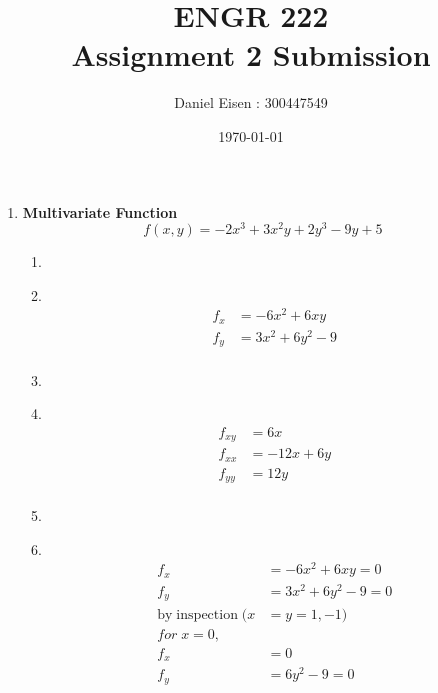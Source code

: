 \documentclass[11pt]{article}
\title{ENGR 222 \\ Assignment 2 Submission}
\author{Daniel Eisen : 300447549}
\date{\today}
\newcommand\Item[1][]{%
  \ifx\relax#1\relax  \item \else \item[#1] \fi
  \abovedisplayskip=0pt\abovedisplayshortskip=0pt~\vspace*{-\baselineskip}}
\begin{document}
\begin{preview}

    \maketitle

    \begin{enumerate}
        \item \textbf{Multivariate Function}
              $$f(x,y) = -2x^{3} + 3x^{2}y + 2y^{3} - 9y + 5$$
              \begin{enumerate}
                  \Item
                  \begin{align*}
                      f_{x} & = -6x^{2} + 6xy       \\
                      f_{y} & = 3x^{2} + 6y^{2} - 9 \\
                  \end{align*}
                  \Item
                  \begin{align*}
                      f_{xy} & = 6x        \\
                      f_{xx} & = -12x + 6y \\
                      f_{yy} & = 12y       \\
                  \end{align*}
                  \Item
                  \begin{align*}
                      f_x                              & = -6x^{2} + 6xy = 0                                  \\
                      f_y                              & = 3x^{2} + 6y^{2} - 9 = 0                            \\
                      \mathrm{by \; inspection \;}  (x & =y=1,-1)                                             \\
                      for \; x=0,                                                                             \\
                      f_x                              & = 0                                                  \\
                      f_y                              & = 6y^2 - 9 = 0                                       \\

\end{align*}
\end{enumerate}
\end{enumerate}
\end{preview}
\end{document}
